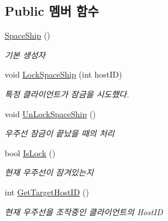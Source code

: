 \subsection*{Public 멤버 함수}
\begin{DoxyCompactItemize}
\item 
\hyperlink{class_space_ship_ae56e545157e761155089250245ad3455}{Space\+Ship} ()
\begin{DoxyCompactList}\small\item\em 기본 생성자 \end{DoxyCompactList}\item 
void \hyperlink{class_space_ship_ae5fba92c8beecfe121056475096a9331}{Lock\+Space\+Ship} (int host\+ID)
\begin{DoxyCompactList}\small\item\em 특정 클라이언트가 잠금을 시도했다. \end{DoxyCompactList}\item 
void \hyperlink{class_space_ship_a6447693614706ed1ac5e1a494d87cd12}{Un\+Lock\+Space\+Ship} ()
\begin{DoxyCompactList}\small\item\em 우주선 잠금이 끝났을 때의 처리 \end{DoxyCompactList}\item 
bool \hyperlink{class_space_ship_aaf915c204b3688322dfb995701f7d6ed}{Is\+Lock} ()
\begin{DoxyCompactList}\small\item\em 현재 우주선이 잠겨있는지 \end{DoxyCompactList}\item 
int \hyperlink{class_space_ship_adbe10320ea9f3310ee2bf2bc207632fe}{Get\+Target\+Host\+ID} ()
\begin{DoxyCompactList}\small\item\em 현재 우주선을 조작중인 클라이언트의 Host\+ID \end{DoxyCompactList}\end{DoxyCompactItemize}
